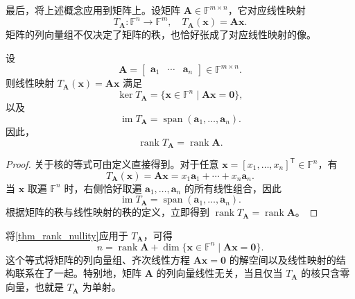 最后，将上述概念应用到矩阵上。设矩阵 \(\mathbf A\in\mathbb F^{m\times n}\)，它对应线性映射
\[
    T_{\mathbf A}:\mathbb F^n\to\mathbb F^m,
    \quad
    T_{\mathbf A}(\bm x)=\mathbf A\bm x.
\]
矩阵的列向量组不仅决定了矩阵的秩，也恰好张成了对应线性映射的像。

\begin{proposition}
    \label{prop_matrix_kernel_image_rank}
    设
    \[
        \mathbf A=
        \begin{bmatrix}
            \bm a_1 & \cdots & \bm a_n
        \end{bmatrix}
        \in\mathbb F^{m\times n}.
    \]
    则线性映射 \(T_{\mathbf A}(\bm x)=\mathbf A\bm x\) 满足
    \[
        \ker T_{\mathbf A}
        =\{\bm x\in\mathbb F^n\mid \mathbf A\bm x=\bm 0\},
    \]
    以及
    \[
        \operatorname{im}T_{\mathbf A}
        =\operatorname{span}(\bm a_1,\ldots,\bm a_n).
    \]
    因此，
    \[
        \operatorname{rank}T_{\mathbf A}=\operatorname{rank}\mathbf A.
    \]
\end{proposition}
\begin{proof}
    关于核的等式可由定义直接得到。对于任意
    \(\bm x=[x_1,\ldots,x_n]^{\mathsf T}\in\mathbb F^n\)，有
    \[
        T_{\mathbf A}(\bm x)
        =\mathbf A\bm x
        =x_1\bm a_1+\cdots+x_n\bm a_n.
    \]
    当 \(\bm x\) 取遍 \(\mathbb F^n\) 时，右侧恰好取遍 \(\bm a_1,\ldots,\bm a_n\) 的所有线性组合，因此
    \[
        \operatorname{im}T_{\mathbf A}
        =\operatorname{span}(\bm a_1,\ldots,\bm a_n).
    \]
    根据矩阵的秩与线性映射的秩的定义，立即得到
    \(\operatorname{rank}T_{\mathbf A}=\operatorname{rank}\mathbf A\)。
\end{proof}

将\cref{thm_rank_nullity}应用于 \(T_{\mathbf A}\)，可得
\[
    n
    =\operatorname{rank}\mathbf A
    +\dim\{\bm x\in\mathbb F^n\mid\mathbf A\bm x=\bm 0\}.
\]
这个等式将矩阵的列向量组、齐次线性方程 \(\mathbf A\bm x=\bm 0\) 的解空间以及线性映射的结构联系在了一起。特别地，矩阵 \(\mathbf A\) 的列向量线性无关，当且仅当 \(T_{\mathbf A}\) 的核只含零向量，也就是 \(T_{\mathbf A}\) 为单射。
